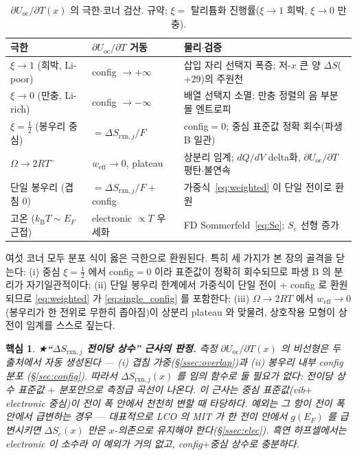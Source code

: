 \documentclass[11pt,a4paper]{article}
\newtheorem*{keybox}{핵심}
\newcommand{\rxn}{\mathrm{rxn}}
\newcommand{\oc}{\mathrm{oc}}
\newcommand{\eff}{\mathrm{eff}}
\newcommand{\kB}{k_{\mathrm B}}
\begin{document}
\begin{table}[t]
\centering\small
\renewcommand{\arraystretch}{1.35}
\caption{$\partial U_\oc/\partial T(x)$ 의 극한$\cdot$코너 검산. 규약: $\xi=$ 탈리튬화 진행률($\xi\to1$ 희박, $\xi\to0$ 만충).}
\label{tab:limits}
\begin{tabular}{l l l}
\toprule
극한 & $\partial U_\oc/\partial T$ 거동 & 물리$\cdot$검증 \\
\midrule
$\xi\to1$ (희박, Li-poor) & config $\to+\infty$ & 삽입 자리 선택지 폭증; 저-$x$ 큰 양 $\Delta S$($+29$)의 주원천 \\
$\xi\to0$ (만충, Li-rich) & config $\to-\infty$ & 배열 선택지 소멸; 만충 정렬의 음 부분몰 엔트로피 \\
$\xi=\tfrac12$ (봉우리 중심) & $=\Delta S_{\rxn,j}/F$ & config$=0$; 중심 표준값 정확 회수(파생 B 일관) \\
$\Omega\to2RT^-$ & $w_\eff\to0$, plateau & 상분리 임계; $dQ/dV$ delta화, $\partial U_\oc/\partial T$ 평탄$\cdot$불연속 \\
단일 봉우리 (겹침 0) & $=\Delta S_{\rxn,j}/F+$ config & 가중식~\eqref{eq:weighted} 이 단일 전이로 환원 \\
고온 ($\kB T\!\sim\!E_F$ 근접) & electronic $\propto T$ 우세화 & FD Sommerfeld~\eqref{eq:Se}; $S_e$ 선형 증가 \\
\bottomrule
\end{tabular}
\end{table}

여섯 코너 모두 분포 식이 옳은 극한으로 환원된다. 특히 세 가지가 본 장의 골격을 닫는다: (i) 중심
$\xi=\tfrac12$ 에서 config$=0$ 이라 표준값이 정확히 회수되므로 파생 B 의 분리가 자기일관적이다; (ii) 단일
봉우리 한계에서 가중식이 단일 전이 $+$ config 로 환원되므로 \eqref{eq:weighted} 가 \eqref{eq:single_config} 를
포함한다; (iii) $\Omega\to2RT$ 에서 $w_\eff\to0$(봉우리가 한 전위로 무한히 좁아짐)이 상분리 plateau 와 맞물려,
상호작용 모형이 상전이 임계를 스스로 짚는다.

\begin{keybox}
★\textbf{``$\Delta S_{\rxn,j}$ 전이당 상수'' 근사의 판정.} 측정 $\partial U_\oc/\partial T(x)$ 의 비선형은 두
출처에서 \emph{자동 생성}된다 — (i) 겹침 가중(\S\ref{ssec:overlap})과 (ii) 봉우리 내부 config 분포
(\S\ref{sec:config}). 따라서 $\Delta S_{\rxn,j}(x)$ 를 임의 함수로 둘 필요가 \emph{없다}: 전이당 \emph{상수}
표준값 $+$ 분포만으로 측정급 곡선이 나온다. 이 근사는 \emph{중심 표준값(vib$+$electronic 중심)이 전이 폭 안에서
천천히 변할 때} 타당하다. 예외는 그 항이 전이 폭 \emph{안에서} 급변하는 경우 — 대표적으로 LCO 의 MIT 가 한
전이 안에서 $g(E_F)$ 를 급변시키면 $\Delta S_e(x)$ 만은 $x$-의존으로 유지해야 한다(\S\ref{ssec:elec}). 흑연
하프셀에서는 electronic 이 소수라 이 예외가 거의 없고, config$+$중심 상수로 충분하다.
\end{keybox}
\end{document}
